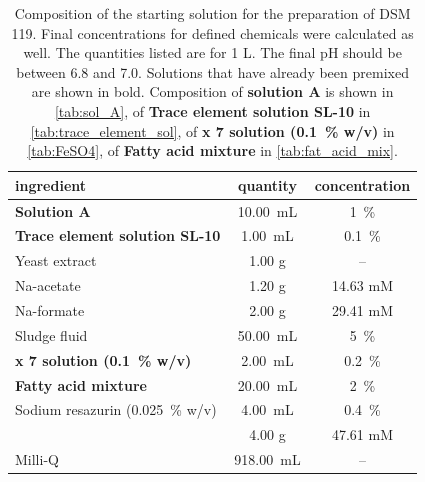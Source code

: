 

\begin{table}[ht]
	\centering
	\caption[Composition of the starting solution for the preparation of DSM 119.]{Composition of the starting solution for the preparation of DSM 119. Final concentrations for defined chemicals were calculated as well. The quantities listed are for 1 L. The final pH should be between 6.8 and 7.0. Solutions that have already been premixed are shown in bold. Composition of \textbf{solution A} is shown in \cref{tab:sol_A}, of \textbf{Trace element solution SL-10} in \cref{tab:trace_element_sol}, of \textbf{ x 7  solution (0.1~\% w/v)} in \cref{tab:FeSO4}, of \textbf{Fatty acid mixture} in \cref{tab:fat_acid_mix}.}
	\label{tab:DSM_119}
	\begin{tabular}{lcc}
		\toprule
		ingredient & quantity & concentration \\
		\midrule
		\textbf{Solution A} & 10.00~mL & 1~\% \\
		\textbf{Trace element solution SL-10} & 1.00~mL & 0.1~\% \\
		Yeast extract & 1.00 g & -- \\
		Na-acetate & 1.20 g & 14.63 mM \\
		Na-formate & 2.00 g & 29.41 mM \\
		Sludge fluid & 50.00~mL & 5~\% \\
		\textbf{\ch{FeSO4} x 7 \ch{H2O} solution (0.1~\% w/v)} & 2.00~mL & 0.2~\% \\
		\textbf{Fatty acid mixture} & 20.00~mL & 2~\% \\
		Sodium resazurin (0.025~\% w/v) & 4.00~mL & 0.4~\% \\
		\ch{NaHCO3} & 4.00 g & 47.61 mM \\
		Milli-Q \ch{H2O} & 918.00~mL & -- \\
		\bottomrule
		
	\end{tabular}
\end{table}